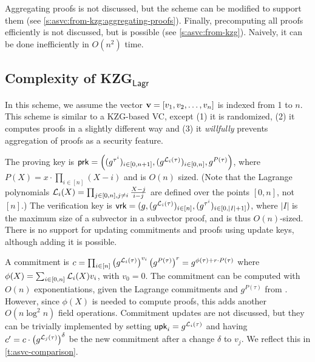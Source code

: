 Aggregating proofs is not discussed, but the scheme can be modified to support them (see \cref{s:asvc:from-kzg:aggregating-proofs}).
Finally, precomputing all proofs efficiently is not discussed, but is possible (see \cref{s:asvc:from-kzg}).
Naively, it can be done inefficiently in $O(n^2)$ time.

\subsection{Complexity of KZG$_\mathsf{Lagr}$~\cite{CDHK15}}
\label{s:complexity-kzg-lagr}
In this scheme, we assume the vector $\bm{\mathrm{v}}=[v_1, v_2, \dots, v_n]$ is indexed from 1 to $n$.
This scheme is similar to a KZG-based VC, except (1) it is randomized, (2) it computes proofs in a slightly different way and (3) it \textit{willfully} prevents aggregation of proofs as a security feature.

The proving key is $\mathsf{prk}=\left((g^{\tau^i})_{i\in [0,n+1]}, (g^{\mathcal{L}_i(\tau)})_{i\in[0,n]},g^{P(\tau)}\right)$, where $P(X)=x\cdot \prod_{i\in[n]} (X-i)$ and is $O(n)$ sized.
(Note that the Lagrange polynomials $\mathcal{L}_i(X)=\prod_{j\in[0,n],j\ne i} \frac{X-j}{i-j}$ are defined over the points $[0,n]$, not $[n]$.)
The verification key is $\mathsf{vrk}=(g,(g^{\mathcal{L}_i(\tau)})_{i\in [n]},(g^{\tau^i})_{i\in [0,|I|+1]})$, where $|I|$ is the maximum size of a subvector in a subvector proof, and is thus $O(n)$-sized.
There is no support for updating commitments and proofs using update keys, although adding it is possible.

A commitment is $c=\prod_{i\in[n]} \left(g^{\mathcal{L}_i(\tau)}\right)^{v_i} \left(g^{P(\tau)}\right)^{r}= g^{\phi(\tau) + r\cdot P(\tau)}$ where $\phi(X)=\sum_{i\in [0,n]} \mathcal{L}_i(X) v_i$, with $v_0 = 0$.
The commitment can be computed with $O(n)$ exponentiations, given the Lagrange commitments and $g^{P(\tau)}$ from \prk.
However, since $\phi(X)$ is needed to compute proofs, this adds another $O(n\log^2{n})$ field operations.
Commitment updates are not discussed, but they can be trivially implemented by setting $\mathsf{upk}_i = g^{\mathcal{L}_i(\tau)}$ and having $c' = c \cdot \left(g^{\mathcal{L}_j(\tau)}\right)^{\delta}$ be the new commitment after a change $\delta$ to $v_j$.
We reflect this in \cref{t:asvc-comparison}.

